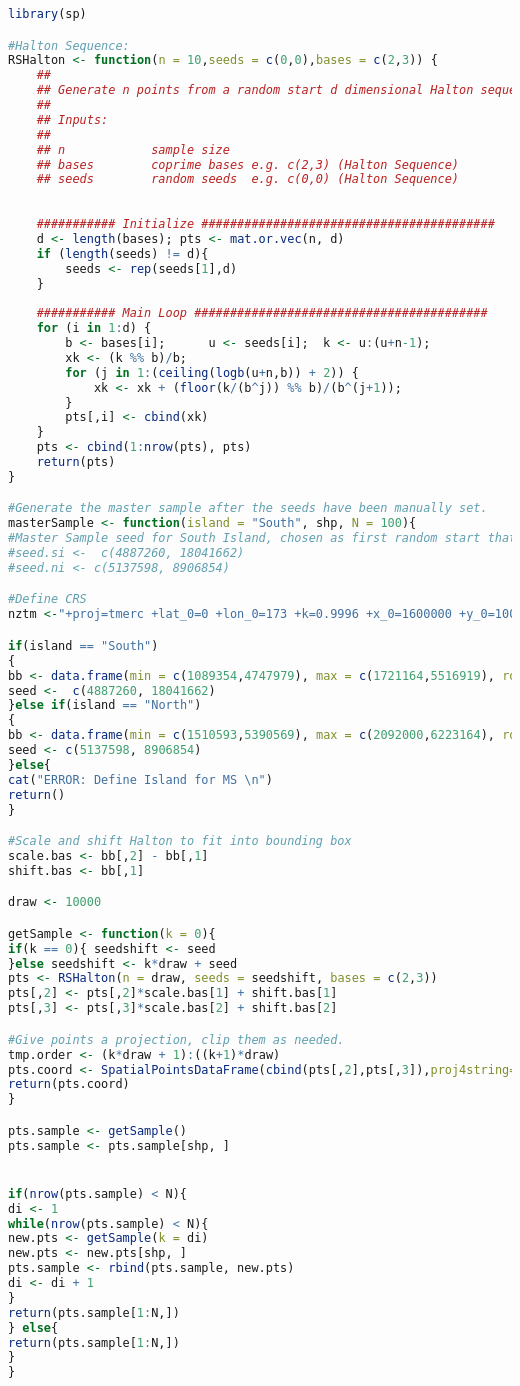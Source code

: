 \documentclass[]{article}
\begin{document}
\begin{lstlisting}[language=R]
library(sp)

#Halton Sequence:
RSHalton <- function(n = 10,seeds = c(0,0),bases = c(2,3)) {
	##
	## Generate n points from a random start d dimensional Halton sequence.
	##
	## Inputs:
	## 
	## n 			sample size
	## bases    	coprime bases e.g. c(2,3) (Halton Sequence)
	## seeds  		random seeds  e.g. c(0,0) (Halton Sequence)
	
	
	########### Initialize #########################################
	d <- length(bases);	pts <- mat.or.vec(n, d)
	if (length(seeds) != d){
		seeds <- rep(seeds[1],d)
	}
	
	########### Main Loop #########################################
	for (i in 1:d) {
		b <- bases[i];   	u <- seeds[i];	k <- u:(u+n-1);
		xk <- (k %% b)/b;
		for (j in 1:(ceiling(logb(u+n,b)) + 2)) {
			xk <- xk + (floor(k/(b^j)) %% b)/(b^(j+1));
		}
		pts[,i] <- cbind(xk)
	}
	pts <- cbind(1:nrow(pts), pts)
	return(pts)
}

#Generate the master sample after the seeds have been manually set.
masterSample <- function(island = "South", shp, N = 100){
#Master Sample seed for South Island, chosen as first random start that fell into SI
#seed.si <-  c(4887260, 18041662)
#seed.ni <- c(5137598, 8906854)

#Define CRS
nztm <-"+proj=tmerc +lat_0=0 +lon_0=173 +k=0.9996 +x_0=1600000 +y_0=10000000 +ellps=GRS80 +towgs84=0,0,0,0,0,0,0 +units=m +no_defs"

if(island == "South")
{
bb <- data.frame(min = c(1089354,4747979), max = c(1721164,5516919), row.names = c("x","y"))
seed <-  c(4887260, 18041662)
}else if(island == "North")
{
bb <- data.frame(min = c(1510593,5390569), max = c(2092000,6223164), row.names = c("x","y"))
seed <- c(5137598, 8906854)
}else{
cat("ERROR: Define Island for MS \n")
return()
}

#Scale and shift Halton to fit into bounding box
scale.bas <- bb[,2] - bb[,1]
shift.bas <- bb[,1]

draw <- 10000

getSample <- function(k = 0){
if(k == 0){ seedshift <- seed 
}else seedshift <- k*draw + seed
pts <- RSHalton(n = draw, seeds = seedshift, bases = c(2,3))
pts[,2] <- pts[,2]*scale.bas[1] + shift.bas[1]
pts[,3] <- pts[,3]*scale.bas[2] + shift.bas[2]

#Give points a projection, clip them as needed.
tmp.order <- (k*draw + 1):((k+1)*draw)
pts.coord <- SpatialPointsDataFrame(cbind(pts[,2],pts[,3]),proj4string=CRS("+proj=tmerc +lat_0=0 +lon_0=173 +k=0.9996 +x_0=1600000 +y_0=10000000 +ellps=GRS80 +units=m +no_defs"), data.frame(SiteOrder = tmp.order))
return(pts.coord)
}

pts.sample <- getSample()
pts.sample <- pts.sample[shp, ]


if(nrow(pts.sample) < N){
di <- 1
while(nrow(pts.sample) < N){
new.pts <- getSample(k = di)
new.pts <- new.pts[shp, ]
pts.sample <- rbind(pts.sample, new.pts)
di <- di + 1
}
return(pts.sample[1:N,])
} else{
return(pts.sample[1:N,])
}
}



\end{lstlisting}


	
\end{document}
